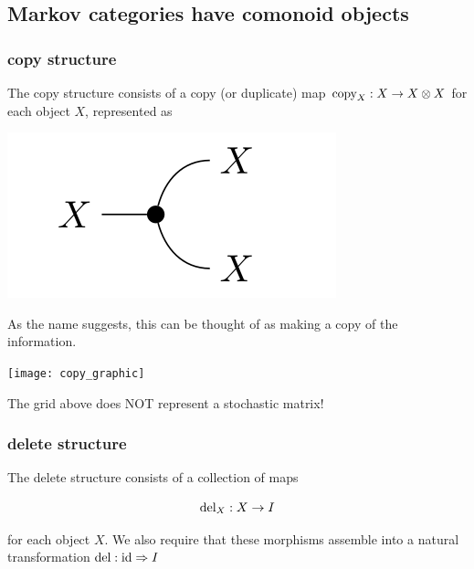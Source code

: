 \subsection{Markov categories have comonoid objects}
\begin{frame}
    \frametitle{copy structure}
    \begin{minipage}{.57\textwidth}
        The copy structure consists of a copy (or duplicate) map ${\text{\normalfont copy} _X: X\to X\otimes X}$ for each object $X$, represented as

        \begin{center}
            \includegraphics[width=.4\textwidth]{graphics/string/markov_copy.png}
        \end{center}

        As the name suggests, this can be thought of as making a copy of the information.
    \end{minipage}\pause
    \hfill
    \begin{minipage}{.38\textwidth}
        \texttt{[image: copy\_graphic]}
        \caption{The grid above does NOT represent a stochastic matrix!}
    \end{minipage}
\end{frame}


\begin{frame}
    \frametitle{delete structure}
    The delete structure consists of a collection of maps
    \begin{minipage}{.48\textwidth}
        \[
            \text{\normalfont del} _X : X\to I
        \]
    \end{minipage}
    \hfill %
    \begin{minipage}{.48\textwidth}
    \end{minipage}
    \vspace{5mm}

    for each object $X$. We also require that these morphisms assemble into a natural transformation $\text{\normalfont del} : \text{\normalfont id} \Rightarrow I$
\end{frame}

